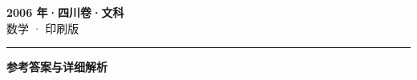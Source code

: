 \documentclass[zihao=5, a4paper]{ctexart}
\begin{document}
\begin{center}
  {\Large\bfseries 2006 年·四川卷·文科}\\[4pt]
  {\large 数学 · 印刷版}
\end{center}
\medskip
{}

\par\bigskip\hrule\bigskip
{}
\begin{center}{\large\bfseries 参考答案与详细解析}\end{center}
\smallskip

\end{document}

